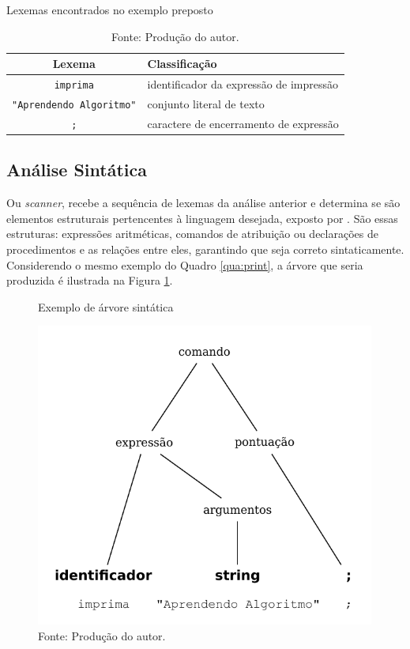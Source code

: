 \begin{table}[h]
\centering
  \caption{Lexemas encontrados no exemplo preposto}\label{tab:lexemas}
\begin{tabular}{ c | l }\hline
\textbf{Lexema} & \textbf{Classificação} \\ \hline
\texttt{imprima} & identificador da expressão de impressão \\ \hline
\texttt{"Aprendendo Algoritmo"} & conjunto literal de texto \\ \hline
\texttt{;} & caractere de encerramento de expressão \\ \hline
\end{tabular}
  \caption*{\ifdraft{\color{green}}{}\footnotesize Fonte: Produção do autor.}
\end{table}

\subsection{Análise Sintática}

Ou \textit{scanner}, recebe a sequência de lexemas da análise anterior e determina se são elementos estruturais pertencentes à linguagem desejada, exposto por . São essas estruturas: expressões aritméticas, comandos de atribuição ou declarações de procedimentos e as relações entre eles, garantindo que seja correto sintaticamente. Considerendo o mesmo exemplo do Quadro \ref{qua:print}, a árvore que seria produzida é ilustrada na Figura \ref{fig:ast}.

\begin{figure}[h]
  \caption{\ifdraft{\color{green}}{}Exemplo de árvore sintática}\label{fig:ast}
  \centering
\includegraphics[width=.4\textwidth,height=10cm,keepaspectratio]{figures/ast.pdf}
  \caption*{\ifdraft{\color{green}}{}\footnotesize Fonte: Produção do autor.}
\end{figure}

